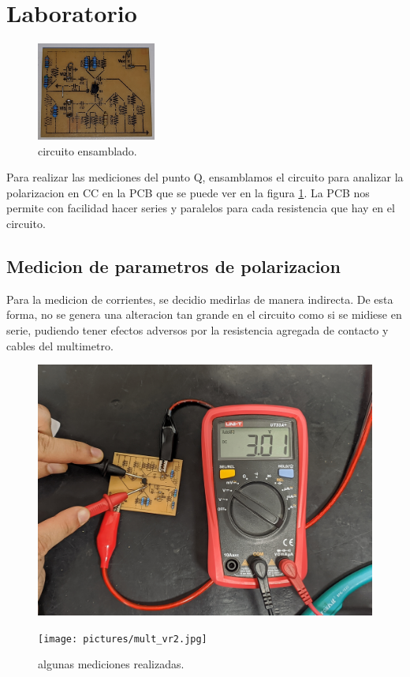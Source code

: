   \section{Laboratorio}
    \begin{figure}
      \vspace{-1cm}
      \centering
      \includegraphics[width=0.35\textwidth]{pictures/pcb.jpg}
      \caption{circuito ensamblado.}
      \label{fig:pcb}
    \end{figure}
    Para realizar las mediciones del punto Q, ensamblamos el circuito para analizar la polarizacion en CC en la PCB que
    se puede ver en la figura \ref{fig:pcb}. La PCB nos permite con facilidad hacer series y paralelos para cada
    resistencia que hay en el circuito.

    \subsection{Medicion de parametros de polarizacion}
      Para la medicion de corrientes, se decidio medirlas de manera indirecta. De esta forma, no se genera una
      alteracion tan grande en el circuito como si se midiese en serie, pudiendo tener efectos adversos por la
      resistencia agregada de contacto y cables del multimetro.
      \begin{figure}[!ht]
        \centering
        \begin{minipage}{0.49\textwidth}
          \centering
          \includegraphics[width=1\textwidth]{pictures/mult_vce.jpg}
        \end{minipage}
        \hfill
        \begin{minipage}{0.49\textwidth}
          \centering
          \texttt{[image: pictures/mult\_vr2.jpg]}
        \end{minipage}
        \caption{algunas mediciones realizadas.}
      \end{figure}

